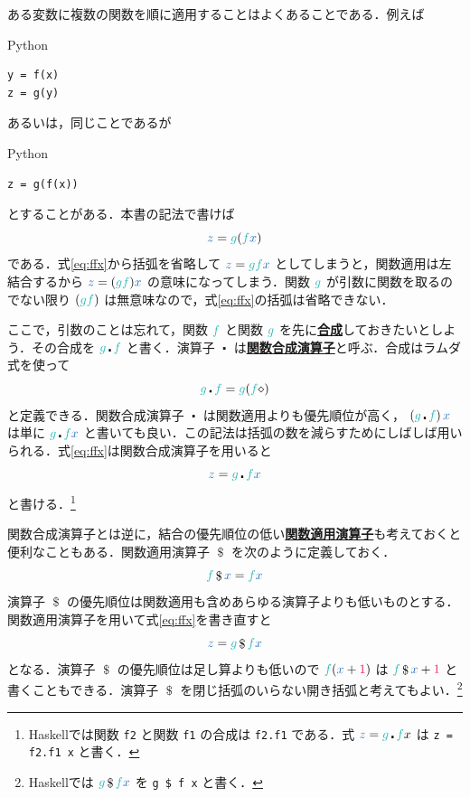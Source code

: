 \documentclass[a5paper,twoside,fleqn,draft]{jsbook}
\def\constantColor{WildStrawberry}
\def\varColor{NavyBlue}
\def\funcColor{BlueGreen}
\newcommand{\programminglanguage}[1]{\textsf{#1}}
\newcommand{\haskell}{\programminglanguage{Haskell}}
\newcommand{\python}{\programminglanguage{Python}}
\newcommand{\keyword}[1]{{\underline{\textbf{#1}}}}
\newcommand{\code}[1]{\texttt{#1}}
\newenvironment{pythoncode}{\begin{itembox}[r]{\python}}{\end{itembox}}
\newcommand{\mConstant}[1]{\textcolor{\constantColor}{#1}}
\newcommand{\mOneNumber}{{\mConstant{1}}}
\newcommand{\mVar}[1]{\textcolor{\varColor}{#1}}
\newcommand{\mAnonParam}{\diamond}
\newcommand{\mXVar}{\mVar{x}}
\newcommand{\mZVar}{\mVar{z}}
\newcommand{\mFunc}[1]{\textcolor{\funcColor}{#1}}
\newcommand{\mFFunc}{{\mFunc{f}}}
\newcommand{\mGFunc}{\mFunc{g}}
\DeclareMathOperator{\mApply}{\$}
\DeclareMathOperator{\mCompFunc}{\centerdot}
\begin{document}
ある変数に複数の関数を順に適用することはよくあることである．例えば
\begin{pythoncode}
\begin{verbatim}
y = f(x)
z = g(y)
\end{verbatim}
\end{pythoncode}
あるいは，同じことであるが
\begin{pythoncode}
\begin{verbatim}
z = g(f(x))
\end{verbatim}
\end{pythoncode}
とすることがある．本書の記法で書けば
\begin{equation}
  \label{eq:ffx}
  \mZVar=
  \mGFunc(\mFFunc\mXVar)
\end{equation}
である．式\eqref{eq:ffx}から括弧を省略して $\mZVar=\mGFunc\mFFunc\mXVar$ としてしまうと，関数適用は左結合するから $\mZVar=(\mGFunc\mFFunc)\mXVar$ の意味になってしまう．関数 $\mGFunc$ が引数に関数を取るのでない限り $(\mGFunc\mFFunc)$ は無意味なので，式\eqref{eq:ffx}の括弧は省略できない．

ここで，引数のことは忘れて，関数 $\mFFunc$ と関数 $\mGFunc$ を先に\keyword{合成}しておきたいとしよう．その合成を $\mGFunc\mCompFunc \mFFunc$ と書く．演算子 $\mCompFunc$ は\keyword{関数合成演算子}と呼ぶ．合成はラムダ式を使って
\begin{equation}
  \mGFunc\mCompFunc \mFFunc
  =\mGFunc(\mFFunc\mAnonParam)
\end{equation}
と定義できる．関数合成演算子 $\mCompFunc$ は関数適用よりも優先順位が高く， $\left(\mGFunc\mCompFunc \mFFunc\right)\mXVar$ は単に $\mGFunc\mCompFunc\mFFunc\mXVar$ と書いても良い．この記法は括弧の数を減らすためにしばしば用いられる．式\eqref{eq:ffx}は関数合成演算子を用いると
\begin{equation}
  \mZVar
  =\mGFunc\mCompFunc\mFFunc\mXVar
\end{equation}
と書ける．\footnote{\haskell では関数 \code{f2} と関数 \code{f1} の合成は \code{f2.f1} である．式 $\mZVar=\mGFunc\mCompFunc \mFFunc x$ は \code{z = f2.f1 x} と書く．}

関数合成演算子とは逆に，結合の優先順位の低い\keyword{関数適用演算子}も考えておくと便利なこともある．関数適用演算子 $\mApply$ を次のように定義しておく．
\begin{equation}
  \mFFunc\mApply\mXVar
  =\mFFunc\mXVar
\end{equation}
演算子 $\mApply$ の優先順位は関数適用も含めあらゆる演算子よりも低いものとする．関数適用演算子を用いて式\eqref{eq:ffx}を書き直すと
\begin{equation}
  \mZVar
  =\mGFunc\mApply\mFFunc\mXVar
\end{equation}
となる．演算子 $\mApply$ の優先順位は足し算よりも低いので $\mFFunc(\mXVar+\mOneNumber)$ は $\mFFunc\mApply\mXVar+\mOneNumber$ と書くこともできる．演算子 $\mApply$ を閉じ括弧のいらない開き括弧と考えてもよい．\footnote{\haskell では $\mGFunc\mApply\mFFunc\mXVar$ を \code{g \$ f x} と書く．}
\end{document}
